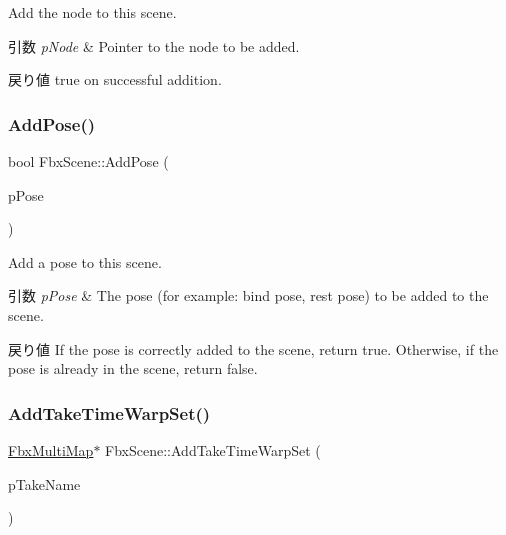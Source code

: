 Add the node to this scene. 
\begin{DoxyParams}{引数}
{\em p\+Node} & Pointer to the node to be added. \\
\hline
\end{DoxyParams}
\begin{DoxyReturn}{戻り値}
true on successful addition. 
\end{DoxyReturn}
\mbox{\label{class_fbx_scene_a41080e786745c1ebdc1c86a80a8e7961}} 
\subsubsection{\texorpdfstring{Add\+Pose()}{AddPose()}}
{\footnotesize\ttfamily bool Fbx\+Scene\+::\+Add\+Pose (\begin{DoxyParamCaption}\item[{\hyperlink{class_fbx_pose}{Fbx\+Pose} $\ast$}]{p\+Pose }\end{DoxyParamCaption})}

Add a pose to this scene. 
\begin{DoxyParams}{引数}
{\em p\+Pose} & The pose (for example\+: bind pose, rest pose) to be added to the scene. \\
\hline
\end{DoxyParams}
\begin{DoxyReturn}{戻り値}
If the pose is correctly added to the scene, return {\ttfamily true}. Otherwise, if the pose is already in the scene, return {\ttfamily false}. 
\end{DoxyReturn}
\mbox{\label{class_fbx_scene_aef596fedc76d369a7912ef107ee24113}} 
\subsubsection{\texorpdfstring{Add\+Take\+Time\+Warp\+Set()}{AddTakeTimeWarpSet()}}
{\footnotesize\ttfamily \hyperlink{class_fbx_multi_map}{Fbx\+Multi\+Map}$\ast$ Fbx\+Scene\+::\+Add\+Take\+Time\+Warp\+Set (\begin{DoxyParamCaption}\item[{char $\ast$}]{p\+Take\+Name }\end{DoxyParamCaption})}


